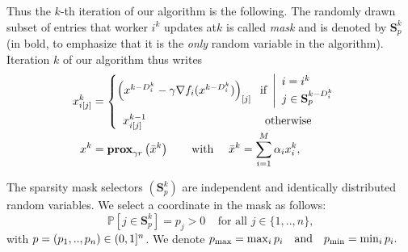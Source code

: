 Thus the $k$-th iteration of our algorithm is the following.
The randomly drawn subset of entries that worker $i^k$ updates at\;$k$ is called \emph{mask} and is denoted by $\mathbf{S}_p^k$ (in bold, to emphasize that it is the \emph{only} random variable in the algorithm).
Iteration $k$ of our algorithm thus writes
\begin{subequations}
 \begin{align*}
x_{i[j]}^k &= \left\{ 
\begin{array}{ll}
 \!\!\!\left( x^{k-D_i^k}    - \gamma \nabla f_i( x^{k-D_i^k}) \right)_{[j]}  \hspace*{-0.2cm}  &  \hspace*{0ex} \text{ if } \left| \begin{array}{l}
    i = i^k\\ j\in\mathbf{S}_p^{k-D_i^k}
 \end{array} \right.  \\[0.5cm]
x_{i[j]}^{k-1} & \hspace*{1ex}\text{ otherwise }
\end{array}
\right.
\\[-0.5ex]
x^k &= \rprox \left(\barx^k\right) \qquad \text{with }\quad \barx^k=\sum_{i=1}^M \alpha_i x_i^k ,
\end{align*}
\end{subequations}


\begin{assumption}
\label{hyp:algo}
The sparsity mask selectors $(\mathbf{S}^k_p)$ are independent and identically distributed random variables. We select a coordinate in the mask as follows:
\[
\mathbb{P}[j\in\mathbf{S}_p^k] = p_j > 0 ~~~~~ \text{for all $j\in\{1,..,n\}$,}
\]
with ${p} = (p_1,..,p_n) \in(0,1]^n$.
We denote
$
p_{\max} = \max_i p_i ~~~\text{and}~~~ p_{\min} = \min_i p_i.
$
\end{assumption}



